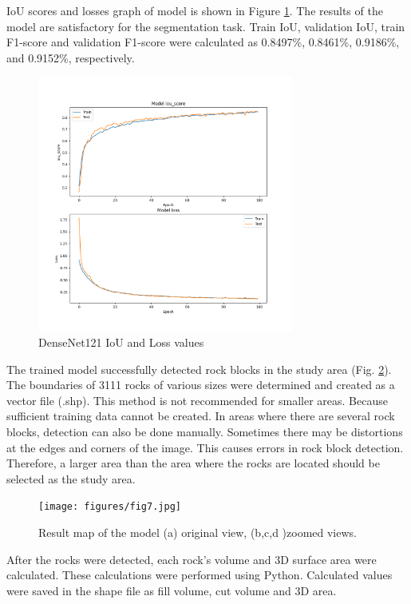 \documentclass[a4paper,fleqn]{cas-sc}
\begin{document}
IoU scores and losses graph of model is shown in Figure \ref{fig:Figure6}. The results of the model are satisfactory for the segmentation task. Train IoU, validation IoU, train F1-score and validation F1-score were calculated as 0.8497\%, 0.8461\%, 0.9186\%, and 0.9152\%, respectively.

\begin{figure}
	\centering
	\includegraphics[width=0.75\textwidth]{figures/fig6.png}
	\caption{DenseNet121 IoU and Loss values}
	\label{fig:Figure6}
\end{figure}

The trained model successfully detected rock blocks in the study area (Fig. \ref{fig:Figure7}). The boundaries of 3111 rocks of various sizes were determined and created as a vector file (.shp). This method is not recommended for smaller areas. Because sufficient training data cannot be created. In areas where there are several rock blocks, detection can also be done manually. 
Sometimes there may be distortions at the edges and corners of the image. This causes errors in rock block detection. Therefore, a larger area than the area where the rocks are located should be selected as the study area.

\begin{figure}
	\centering
	\texttt{[image: figures/fig7.jpg]}
	\caption{Result map of the model (a) original view, (b,c,d )zoomed views.}
	\label{fig:Figure7}
\end{figure}

After the rocks were detected, each rock's volume and 3D surface area were calculated. These calculations were performed using Python. Calculated values were saved in the shape file as fill volume, cut volume and 3D area.
\end{document}
